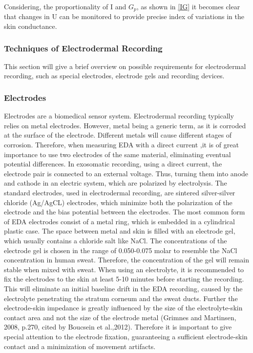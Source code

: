 Considering, the proportionality of I and $G_{p}$, as shown in \ref{IG} it becomes clear that changes in U can be monitored to provide precise index of variations in the skin conductance.\\

\subsubsection{Techniques of Electrodermal Recording}

This section will give a brief overview on possible requirements for electrodermal recording, such as special electrodes, electrode gels and recording devices.

\subsubsection*{Electrodes}
Electrodes are a biomedical sensor system. Electrodermal recording typically relies on metal electrodes. However, metal being a generic term, as it is corroded at the surface of the electrode. Different metals will cause different stages of corrosion. Therefore, when measuring EDA with a direct current ,it is of great importance to use two electrodes of the same material, eliminating eventual potential differences. In exosomatic recording, using a direct current, the electrode pair is connected to an external voltage. Thus, turning them into anode and cathode in an electric system, which are polarized by electrolysis.
The standard electrodes, used in electrodermal recording, are sintered silver-silver chloride (Ag/AgCL) electrodes, which minimize both the polarization of the electrode and the bias potential between the electrodes. The most common form of EDA electrodes consist of a metal ring, which is embedded in a cylindrical plastic case. The space between metal and skin is filled with an electrode gel, which usually contains a chloride salt like NaCl. The concentrations of the electrode gel is chosen in the range of 0.050-0.075 molar to resemble the NaCl concentration in human sweat. Therefore, the concentration of the gel will remain stable when mixed with sweat. When using an electrolyte, it is recommended to fix the electrodes to the skin at least 5-10 minutes before starting the recording. This will eliminate an initial  baseline drift in the EDA recording, caused by the electrolyte penetrating the stratum corneum and the sweat ducts. Further the electrode-skin impedance is greatly influenced by the size of the electrolyte-skin contact area and not the size of the electrode metal (Grimnes and Martinsen, 2008, p.270, cited by Boucsein et al.,2012). Therefore it is important to give special attention to the electrode fixation, guaranteeing a sufficient electrode-skin contact and a minimization of movement artifacts.

